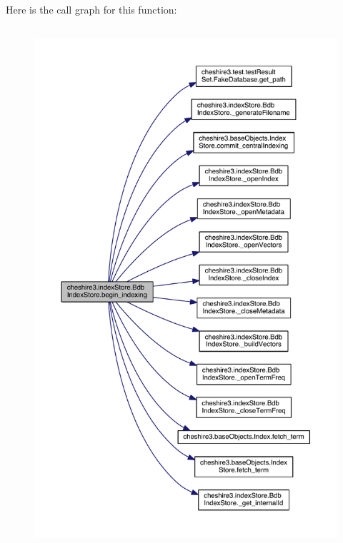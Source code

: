 Here is the call graph for this function\-:
\nopagebreak
\begin{figure}[H]
\begin{center}
\leavevmode
\includegraphics[height=550pt]{classcheshire3_1_1index_store_1_1_bdb_index_store_a7ce664b585847e15da0d4aecbcf2ca0e_cgraph}
\end{center}
\end{figure}


